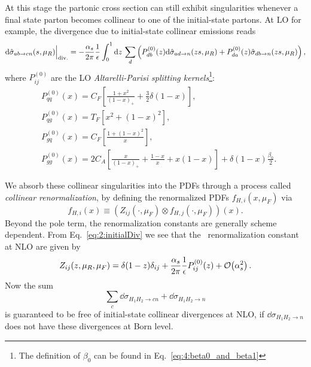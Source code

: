 At this stage the partonic cross section can still exhibit singularities whenever a final state parton becomes collinear to one of the initial-state partons. At \acs{LO} for example, the divergence due to initial-state collinear emissions reads
\begin{equation}
\mathrm{d} \hat{\sigma}_{a b \rightarrow c n}(s, \mu_R) \Big\vert_{\text{div.}} = - \frac{\alpha_s}{2 \pi} \frac{1}{\epsilon}  \int_0^1 \mathrm{d} z\, \sum_d \left(P_{db}^{(0)}(z) \mathrm{d} \hat{\sigma}_{a d \rightarrow n}(z s, \mu_R) + P_{da}^{(0)}(z) \hat{\sigma}_{d b \rightarrow n}(zs, \mu_R) \right),
\label{eq:2:initialDiv}
\end{equation}
where $P_{ij}^{(0)}$ are the \acs{LO} \textit{Altarelli-Parisi splitting kernels}\footnote{The definition of $\beta_0$ can be found in Eq.~\eqref{eq:4:beta0_and_beta1}}:
\begin{equation}
\begin{split}
&P_{qq}^{(0)}(x) = C_F \left[ \frac{1 + x^2}{(1 - x)_+} + \frac{3}{2} \delta (1 - x) \right], \\[3mm]
&P_{qg}^{(0)}(x) = T_F \left[ x^2 + (1 - x)^2 \right], \\[3mm]
&P_{gq}^{(0)}(x) = C_F \left[ \frac{1 + (1 - x)^2}{x} \right], \\[2mm]
&P_{gg}^{(0)}(x) = 2C_A \left[ \frac{x}{(1 - x)_+} + \frac{1 - x}{x} + x (1 - x) \right] + \delta(1 - x) \frac{\beta_0}{2}.
\end{split}
\label{eq:2:Altarelli_Parisi_splitting_functions}
\end{equation}

We absorb these collinear singularities into the PDFs through a process called \textit{collinear renormalization}, by defining the renormalized \acs{PDF}s $f_{H, i}(x, \mu_F)$ via
\begin{equation}
f_{H, i}(x) \equiv (Z_{ij}(\cdot, \mu_F) \otimes f_{H, j}(\cdot, \mu_F))(x).
\end{equation}
Beyond the pole term, the renormalization constants are generally scheme dependent. From Eq.~\eqref{eq:2:initialDiv} we see that the \MS\ renormalization constant at NLO are given by
\begin{equation}
Z_{ij}(z, \mu_R, \mu_F) = \delta(1 - z) \delta_{ij} + \frac{\alpha_s}{2 \pi} \frac{1}{\epsilon} P_{ij}^{(0)}(z) + \mathcal{O}\!\left(\alpha_s^2\right).
\end{equation}
Now the sum
\begin{equation}
\sum_c \dd \sigma_{H_1 H_2 \rightarrow c n} + \dd \sigma_{H_1 H_2 \rightarrow n}
\end{equation}
is guaranteed to be free of initial-state collinear divergences at \acs{NLO}, if $\dd \sigma_{H_1 H_2 \rightarrow n}$ does not have these divergences at Born level.


